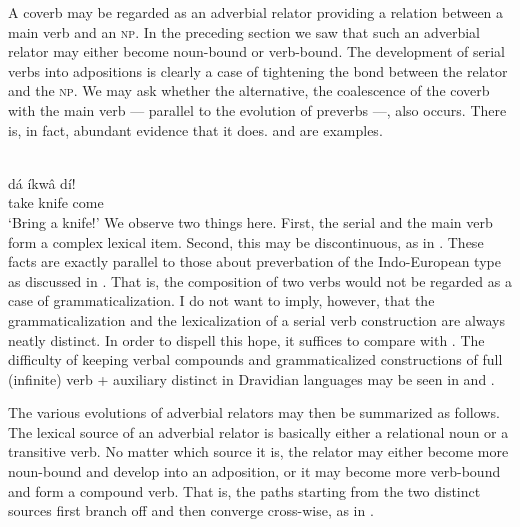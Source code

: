 \noindent A coverb may be regarded as an adverbial relator providing a relation between a main verb and an \textsc{np}. In the preceding section we saw that such an adverbial relator may either become noun-bound or verb-bound. The development of serial verbs into adpositions is clearly a case of tightening the bond between the relator and the \textsc{np}. We may ask whether the alternative, the coalescence of the coverb with the main verb — parallel to the evolution of preverbs —, also occurs. There is, in fact, abundant evidence that it does.  and  are examples.

\ea\label{ex:E90}
\\
\gll dá  íkwâ  dí!  \\
 take  knife  come  \\
 \glt ‘Bring a knife!’   
\z
{}
\noindent We observe two things here. First, the serial and the main verb form a complex lexical item. Second, this may be discontinuous, as in . These facts are exactly parallel to those about preverbation of the Indo-European type as discussed in . That is, the composition of two verbs would not be regarded as a case of grammaticalization. I do not want to imply, however, that the grammaticalization and the lexicalization of a serial verb construction are always neatly distinct. In order to dispell this hope, it suffices to compare  with . The difficulty of keeping verbal compounds and grammaticalized constructions of full (infinite) verb + auxiliary distinct in Dravidian languages may be seen in \citet[90--96, 109--112]{Bloch1954} and \citet{Kachru1980}.

The various evolutions of adverbial relators may then be summarized as follows. The lexical source of an adverbial relator is basically either a relational noun or a transitive verb. No matter which source it is, the relator may either become more noun-bound and develop into an adposition, or it may become more verb-bound and form a compound verb. That is, the paths starting from the two distinct sources first branch off and then converge cross-wise, as in .

